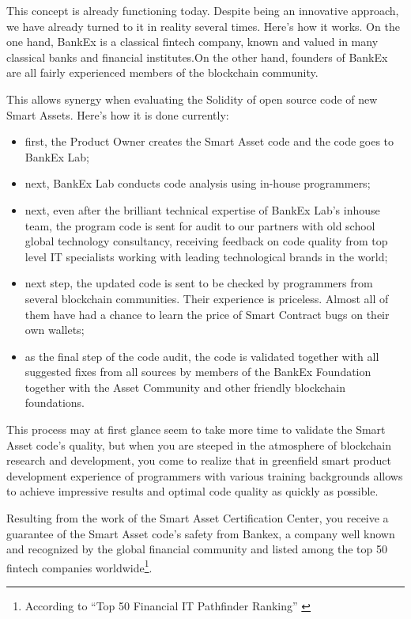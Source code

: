 \documentclass{article}
\begin{document}
\begin{multicols}{2}
This concept is already functioning today. Despite being an innovative approach, we have already turned to it in reality several times. Here's how it works. On the one hand, BankEx is a classical fintech company, known and valued in many classical banks and financial institutes.On the other hand, founders of BankEx are all fairly experienced members of the blockchain community. 

This allows synergy when evaluating the Solidity of open source code of new Smart Assets. Here's how it is done currently:

\begin{itemize}
\item first, the Product Owner creates the Smart Asset code and the code goes to BankEx Lab;
\item next, BankEx Lab conducts code analysis using in-house programmers;
\item next, even after the brilliant technical expertise of BankEx Lab's inhouse team, the program code is sent for audit to our partners with old school global technology consultancy, receiving feedback on code quality from top level IT specialists working with leading technological brands in the world; 
\item next step, the updated code is sent to be checked by programmers from several blockchain communities. Their experience is priceless. Almost all of them have had a chance to learn the price of Smart Contract bugs on their own wallets;
\item as the final step of the code audit, the code is validated together with all suggested fixes from all sources by members of the BankEx Foundation together with the Asset Community and other friendly blockchain foundations.
\end{itemize}

This process may at first glance seem to take more time to validate the Smart Asset code's quality, but when you are steeped in the atmosphere of blockchain research and development, you come to realize that in greenfield smart product development experience of programmers with various training backgrounds allows to achieve impressive results and optimal code quality as quickly as possible.
	
Resulting from the work of the Smart Asset Certification Center, you receive a guarantee of the Smart Asset code's safety from Bankex, a company well known and recognized by the global financial community and listed among the top 50 fintech companies worldwide\footnote{According to \enquote{Top 50 Financial IT Pathfinder Ranking} \cite{top2017}}.


\end{multicols}
\end{document}

